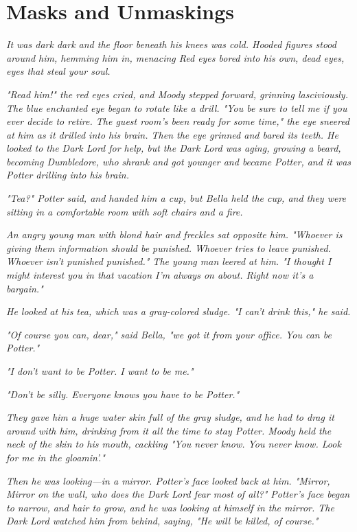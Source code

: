 
\chapter{Masks and Unmaskings}

\emph{It was dark{\el} dark{\el} and the floor beneath his knees was cold. Hooded figures stood around him, hemming him in, menacing{\el} Red eyes bored into his own, dead eyes, eyes that steal your soul.}

\emph{"Read him!" the red eyes cried, and Moody stepped forward, grinning lasciviously. The blue enchanted eye began to rotate like a drill. "You be sure to tell me if you ever decide to retire. The guest room's been ready for some time," the eye sneered at him as it drilled into his brain. Then the eye grinned and bared its teeth. He looked to the Dark Lord for help, but the Dark Lord was aging, growing a beard, becoming Dumbledore, who shrank and got younger and became Potter, and it was Potter drilling into his brain.}

\emph{"Tea?" Potter said, and handed him a cup, but Bella held the cup, and they were sitting in a comfortable room with soft chairs and a fire.}

\emph{An angry young man with blond hair and freckles sat opposite him. "Whoever is giving them information should be punished. Whoever tries to leave{\el} punished. Whoever isn't punished{\el} punished." The young man leered at him. "I thought I might interest you in that vacation I'm always on about. Right now it's a bargain."}

\emph{He looked at his tea, which was a gray-colored sludge. "I can't drink this," he said.}

\emph{"Of course you can, dear," said Bella, "we got it from your office. You can be Potter."}

\emph{"I don't want to be Potter. I want to be me."}

\emph{"Don't be silly. Everyone knows you have to be Potter."}

\emph{They gave him a huge water skin full of the gray sludge, and he had to drag it around with him, drinking from it all the time to stay Potter. Moody held the neck of the skin to his mouth, cackling "You never know. You never know. Look for me in the gloamin'."}

\emph{Then he was looking—in a mirror. Potter's face looked back at him. "Mirror, Mirror on the wall, who does the Dark Lord fear most of all?" Potter's face began to narrow, and hair to grow, and he was looking at himself in the mirror. The Dark Lord watched him from behind, saying, "He will be killed, of course."}

